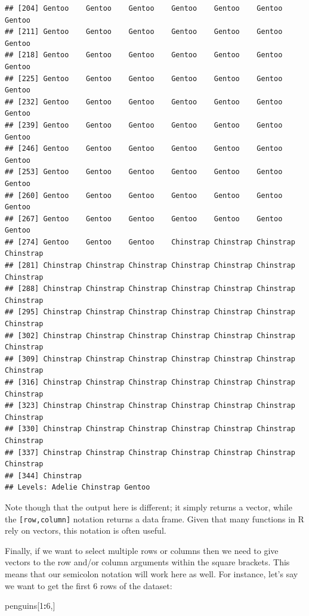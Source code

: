 \documentclass[
]{book}
\newenvironment{Shaded}{\begin{snugshade}}{\end{snugshade}}
\newcommand{\DecValTok}[1]{\textcolor[rgb]{0.00,0.00,0.81}{#1}}
\newcommand{\NormalTok}[1]{#1}
\newcommand{\SpecialCharTok}[1]{\textcolor[rgb]{0.81,0.36,0.00}{\textbf{#1}}}
\begin{document}
\begin{verbatim}
## [204] Gentoo    Gentoo    Gentoo    Gentoo    Gentoo    Gentoo    Gentoo   
## [211] Gentoo    Gentoo    Gentoo    Gentoo    Gentoo    Gentoo    Gentoo   
## [218] Gentoo    Gentoo    Gentoo    Gentoo    Gentoo    Gentoo    Gentoo   
## [225] Gentoo    Gentoo    Gentoo    Gentoo    Gentoo    Gentoo    Gentoo   
## [232] Gentoo    Gentoo    Gentoo    Gentoo    Gentoo    Gentoo    Gentoo   
## [239] Gentoo    Gentoo    Gentoo    Gentoo    Gentoo    Gentoo    Gentoo   
## [246] Gentoo    Gentoo    Gentoo    Gentoo    Gentoo    Gentoo    Gentoo   
## [253] Gentoo    Gentoo    Gentoo    Gentoo    Gentoo    Gentoo    Gentoo   
## [260] Gentoo    Gentoo    Gentoo    Gentoo    Gentoo    Gentoo    Gentoo   
## [267] Gentoo    Gentoo    Gentoo    Gentoo    Gentoo    Gentoo    Gentoo   
## [274] Gentoo    Gentoo    Gentoo    Chinstrap Chinstrap Chinstrap Chinstrap
## [281] Chinstrap Chinstrap Chinstrap Chinstrap Chinstrap Chinstrap Chinstrap
## [288] Chinstrap Chinstrap Chinstrap Chinstrap Chinstrap Chinstrap Chinstrap
## [295] Chinstrap Chinstrap Chinstrap Chinstrap Chinstrap Chinstrap Chinstrap
## [302] Chinstrap Chinstrap Chinstrap Chinstrap Chinstrap Chinstrap Chinstrap
## [309] Chinstrap Chinstrap Chinstrap Chinstrap Chinstrap Chinstrap Chinstrap
## [316] Chinstrap Chinstrap Chinstrap Chinstrap Chinstrap Chinstrap Chinstrap
## [323] Chinstrap Chinstrap Chinstrap Chinstrap Chinstrap Chinstrap Chinstrap
## [330] Chinstrap Chinstrap Chinstrap Chinstrap Chinstrap Chinstrap Chinstrap
## [337] Chinstrap Chinstrap Chinstrap Chinstrap Chinstrap Chinstrap Chinstrap
## [344] Chinstrap
## Levels: Adelie Chinstrap Gentoo
\end{verbatim}

Note though that the output here is different; it simply returns a vector, while the \texttt{{[}row,column{]}} notation returns a data frame. Given that many functions in R rely on vectors, this notation is often useful.

Finally, if we want to select multiple rows or columns then we need to give vectors to the row and/or column arguments within the square brackets. This means that our semicolon notation will work here as well. For instance, let's say we want to get the first 6 rows of the dataset:

\begin{Shaded}
\begin{Highlighting}[]
\NormalTok{penguins[}\DecValTok{1}\SpecialCharTok{:}\DecValTok{6}\NormalTok{,]}
\end{Highlighting}
\end{Shaded}
\end{document}
